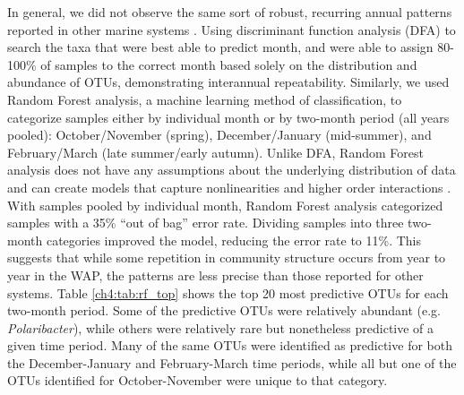 In general, we did not observe the same sort of robust, recurring annual patterns reported in other marine systems \citep{Gilbert2012-ta,Nelson2008-fn,chow2013temporal,fuhrman2006annually}. Using discriminant function analysis (DFA) to search the taxa that were best able to predict month, \citet{fuhrman2006annually} and \citet{Gilbert2012-ta} were able to assign 80-100\% of samples to the correct month based solely on the distribution and abundance of OTUs, demonstrating interannual repeatability. Similarly, we used Random Forest analysis, a machine learning method of classification, to categorize samples either by individual month or by two-month period (all years pooled): October/November (spring), December/January (mid-summer), and February/March (late summer/early autumn). Unlike DFA, Random Forest analysis does not have any assumptions about the underlying distribution of data and can create models that capture nonlinearities and higher order interactions \citep{Breiman2001-og}. With samples pooled by individual month, Random Forest analysis categorized samples with a 35\% ``out of bag'' error rate. Dividing samples into three two-month categories improved the model, reducing the error rate to 11\%. This suggests that while some repetition in community structure occurs from year to year in the WAP, the patterns are less precise than those reported for other systems. Table \ref{ch4:tab:rf_top} shows the top 20 most predictive OTUs for each two-month period. Some of the predictive OTUs were relatively abundant (e.g. \emph{Polaribacter}), while others were relatively rare but nonetheless predictive of a given time period. Many of the same OTUs were identified as predictive for both the December-January and February-March time periods, while all but one of the OTUs identified for October-November were unique to that category.

